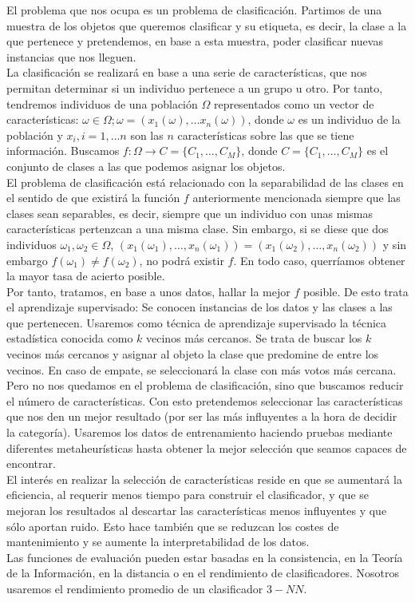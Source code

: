\documentclass[11pt,leqno]{article}
\begin{document}
El problema que nos ocupa es un problema de clasificación. Partimos de una muestra de los objetos que queremos clasificar y su etiqueta, es decir, la clase a la que pertenece y pretendemos, en base a esta muestra, poder clasificar nuevas instancias que nos lleguen.\\
La clasificación se realizará en base a una serie de características, que nos permitan determinar si un individuo pertenece a un grupo u otro. Por tanto, tendremos individuos de una población $\Omega$ representados como un vector de características: $ \omega \in \Omega; \omega = (x_1(\omega), \dots x_n(\omega))$, donde $\omega$ es un individuo de la población y $x_i, i=1,\dots n$ son las $n$ características sobre las que se tiene información. Buscamos $f:\Omega \longrightarrow C=\{C_1, \dots, C_M\}$, donde $C=\{C_1, \dots, C_M\}$ es el conjunto de clases a las que podemos asignar los objetos.\\
El problema de clasificación está relacionado con la separabilidad de las clases en el sentido de que existirá la función $f$  anteriormente mencionada siempre que las clases sean separables, es decir, siempre que un individuo con unas mismas características pertenzcan a una misma clase. Sin embargo, si se diese que dos individuos $\omega_1, \omega_2 \in \Omega$, $(x_1(\omega_1), \dots, x_n(\omega_1))=(x_1(\omega_2), \dots, x_n(\omega_2))$ y sin embargo $f(\omega_1) \neq f(\omega_2)$, no podrá existir $f$. En todo caso, querríamos obtener la mayor tasa de acierto posible.\\  
Por tanto, tratamos, en base a unos datos, hallar la mejor $f$ posible. De esto trata el aprendizaje supervisado: Se conocen instancias de los datos y las clases a las que pertenecen. Usaremos como técnica de aprendizaje supervisado la técnica estadística conocida como $k$ vecinos más cercanos. Se trata de buscar los $k$ vecinos más cercanos y asignar al objeto la clase que predomine de entre los vecinos. En caso de empate, se seleccionará la clase con más votos más cercana.\\  
Pero no nos quedamos en el problema de clasificación, sino que buscamos reducir el número de características. Con esto pretendemos seleccionar las características que nos den un mejor resultado (por ser las más influyentes a la hora de decidir la categoría). Usaremos los datos de entrenamiento haciendo pruebas mediante diferentes metaheurísticas hasta obtener la mejor selección que seamos capaces de encontrar.\\  
El interés en realizar la selección de características reside en que se aumentará la eficiencia, al requerir menos tiempo para construir el clasificador, y que se mejoran los resultados al descartar las características menos influyentes y que sólo aportan ruido. Esto hace también que se reduzcan los costes de mantenimiento y se aumente la interpretabilidad de los datos.\\
Las funciones de evaluación pueden estar basadas en la consistencia, en la Teoría de la Información, en la distancia o en el rendimiento de clasificadores. Nosotros usaremos el rendimiento promedio de un clasificador $3-NN$.
\end{document}
